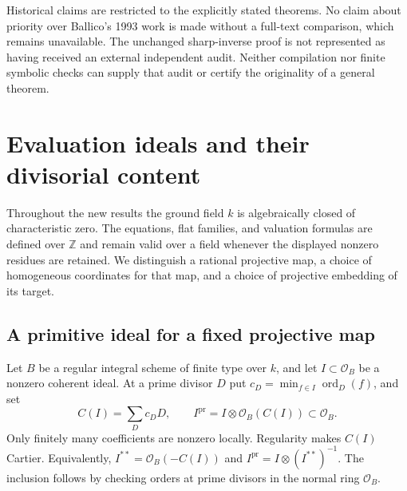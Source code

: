 \documentclass[11pt,reqno]{amsart}
\numberwithin{equation}{section}
\theoremstyle{definition}\newtheorem{definition}[theorem]{Definition}
\theoremstyle{remark}\newtheorem{remark}[theorem]{Remark}
\newcommand{\OO}{\mathcal O}\newcommand{\II}{\mathcal I}
\begin{document}
Historical claims are restricted to the explicitly stated theorems.
No claim about priority over Ballico's 1993 work is made without a
full-text comparison, which remains unavailable. The unchanged
sharp-inverse proof is not represented as having received an external
independent audit. Neither compilation nor finite symbolic checks can
supply that audit or certify the originality of a general theorem.

\section{Evaluation ideals and their divisorial content}
\label{sec:content-v169}
Throughout the new results the ground field $k$ is algebraically closed
of characteristic zero. The equations, flat families, and valuation
formulas are defined over $\mathbb Z$ and remain valid over a field
whenever the displayed nonzero residues are retained. We distinguish a
rational projective map, a choice of homogeneous coordinates for that
map, and a choice of projective embedding of its target.

\subsection{A primitive ideal for a fixed projective map}
Let $B$ be a regular integral scheme of finite type over $k$, and let
$I\subset\OO_B$ be a nonzero coherent ideal. At a prime divisor $D$ put
$c_D=\min_{f\in I}\operatorname{ord}_D(f)$, and set
\[
 C(I)=\sum_D c_DD,\qquad
 I^{\mathrm{pr}}=I\otimes\OO_B(C(I))\subset\OO_B.
\]
Only finitely many coefficients are nonzero locally. Regularity makes
$C(I)$ Cartier. Equivalently, $I^{**}=\OO_B(-C(I))$ and
$I^{\mathrm{pr}}=I\otimes(I^{**})^{-1}$. The inclusion follows by checking
orders at prime divisors in the normal ring $\OO_B$.
\end{document}
